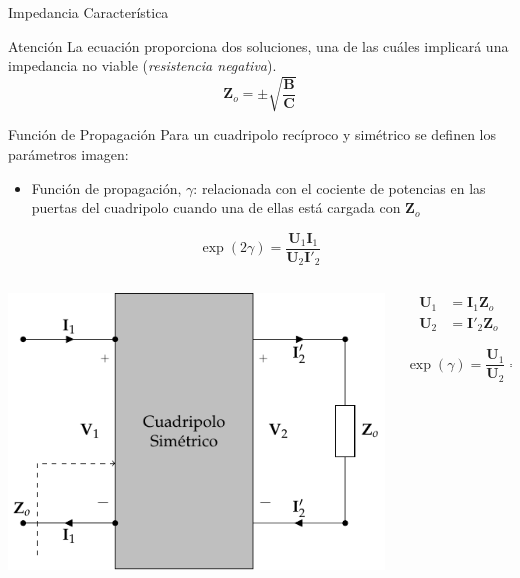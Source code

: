 \documentclass[xcolor={usenames,svgnames,dvipsnames}]{beamer}
\begin{document}
\begin{frame}[label={sec:orge0f8e2f}]{Impedancia Característica}
\begin{block}{Atención}
La ecuación proporciona dos soluciones, una de las cuáles implicará una impedancia no viable (\emph{resistencia negativa}).
\[
\boxed{\mathbf{Z}_o = \pm \sqrt{\frac{\mathbf{B}}{\mathbf{C}}}}
\]
\end{block}
\end{frame}

\begin{frame}[label={sec:orgc027250}]{Función de Propagación}
Para un cuadripolo \alert{recíproco} y \alert{simétrico} se definen los parámetros imagen:

\begin{itemize}
\item \alert{Función de propagación}, \(\gamma\): relacionada con el cociente de potencias en las puertas del cuadripolo cuando una de ellas está cargada con \(\mathbf{Z}_o\)
\end{itemize}

\[
  \exp(2\gamma) = \frac{\mathbf{U}_1\mathbf{I}_1}{\mathbf{U}_2\mathbf{I}'_2}
\]

\begin{columns}
\begin{column}{0.6\columnwidth}
\begin{center}
\includegraphics[width=.9\linewidth]{../figs/cuadripolo_impedancia_caracteristica.pdf}
\end{center}
\end{column}

\begin{column}{0.4\columnwidth}
\begin{align*}
  \mathbf{U}_1 &= \mathbf{I}_1 \mathbf{Z}_o\\
  \mathbf{U}_2 &= \mathbf{I}'_2 \mathbf{Z}_o
\end{align*}

\[
  \boxed{\exp(\gamma) = \frac{\mathbf{U}_1}{\mathbf{U}_2} = \frac{\mathbf{I}_1}{\mathbf{I}'_2}}
\]
\end{column}
\end{columns}
\end{frame}
\end{document}
